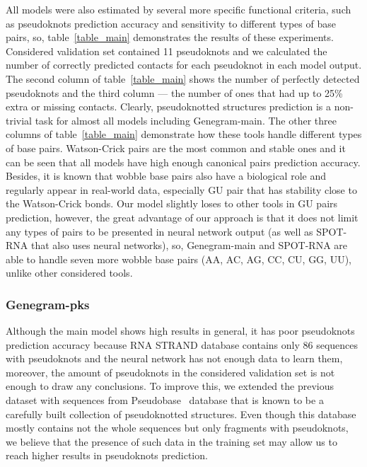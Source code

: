 All models were also estimated by several more specific functional criteria, such as pseudoknots prediction accuracy and sensitivity to different types of base pairs, so, table~\ref{table_main} demonstrates the results of these experiments. Considered validation set contained 11 pseudoknots and we calculated the number of correctly predicted contacts for each pseudoknot in each model output. The second column of table~\ref{table_main} shows the number of perfectly detected pseudoknots and the third column --- the number of ones that had up to 25\% extra or missing contacts. Clearly, pseudoknotted structures prediction is a non-trivial task for almost all models including Genegram-main. The other three columns of table~\ref{table_main} demonstrate how these tools handle different types of base pairs. Watson-Crick pairs are the most common and stable ones and it can be seen that all models have high enough canonical pairs prediction accuracy. Besides, it is known that wobble base pairs also have a biological role and regularly appear in real-world data, especially GU pair that has stability close to the Watson-Crick bonds. Our model slightly loses to other tools in GU pairs prediction, however, the great advantage of our approach is that it does not limit any types of pairs to be presented in neural network output (as well as SPOT-RNA that also uses neural networks), so, Genegram-main and SPOT-RNA are able to handle seven more wobble base pairs (AA, AC, AG, CC, CU, GG, UU), unlike other considered tools.



\subsubsection{Genegram-pks}
Although the main model shows high results in general, it has poor pseudoknots prediction accuracy because RNA STRAND database contains only 86 sequences with pseudoknots and the neural network has not enough data to learn them, moreover, the amount of pseudoknots in the considered validation set is not enough to draw any conclusions. To improve this, we extended the previous dataset with sequences from Pseudobase~\cite{van2000pseudobase} database that is known to be a carefully built collection of pseudoknotted structures. Even though this database mostly contains not the whole sequences but only fragments with pseudoknots, we believe that the presence of such data in the training set may allow us to reach higher results in pseudoknots prediction.

